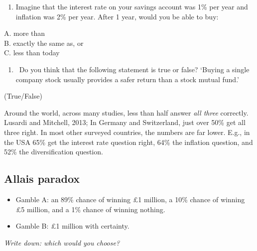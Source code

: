 \documentclass[]{article}
\providecommand{\tightlist}{%
  \setlength{\itemsep}{0pt}\setlength{\parskip}{0pt}}
\begin{document}
\bigskip

\begin{enumerate}
\def\labelenumi{\arabic{enumi}.}
\setcounter{enumi}{1}
\tightlist
\item
  Imagine that the interest rate on your savings account was 1\% per year and inflation was 2\% per year. After 1 year, would you be able to buy:
\end{enumerate}

A. more than\\

B. exactly the same as, or~\\

C. less than today~

\bigskip

\begin{enumerate}
\def\labelenumi{\arabic{enumi}.}
\setcounter{enumi}{2}
\tightlist
\item
  ~Do you think that the following statement is true or false? `Buying a single company stock usually provides a safer return than a stock mutual fund.'~
\end{enumerate}

(True/False)

\medskip

Around the world, across many studies, less than half answer \emph{all three} correctly.
Lusardi and Mitchell, 2013; In Germany and Switzerland, just over 50\% get all three right. In most other surveyed countries, the numbers are far lower. E.g., in the USA 65\% get the interest rate question right, 64\% the inflation question, and 52\% the diversification question.

\hypertarget{allais-paradox}{%
\subsection{Allais paradox}\label{allais-paradox}}

\begin{itemize}
\tightlist
\item
  Gamble A: an 89\% chance of winning \pounds1 million, a 10\% chance of winning \pounds5 million, and a 1\% chance of winning nothing.
\item
  Gamble B: \pounds1 million with certainty.
\end{itemize}

\bigskip

\emph{Write down: which would you choose?}

\hrulefill
\end{document}
